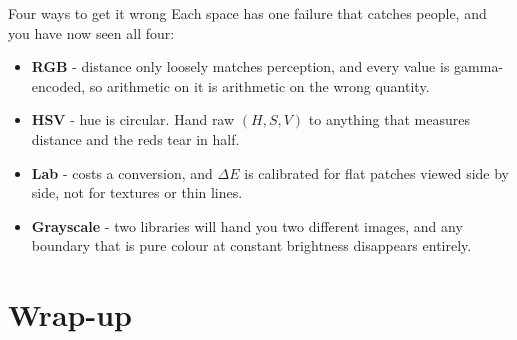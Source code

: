 \documentclass[aspectratio=169]{beamer}
\begin{document}
\begin{frame}{Four ways to get it wrong}
  \small
  Each space has one failure that catches people, and you have now seen all four:
  \vskip 6pt
  \begin{itemize}\small
    \item \textbf{RGB} - distance only loosely matches perception, and every value is
      gamma-encoded, so arithmetic on it is arithmetic on the wrong quantity.
    \item \textbf{HSV} - hue is circular. Hand raw $(H, S, V)$ to anything that measures
      distance and the reds tear in half.
    \item \textbf{Lab} - costs a conversion, and $\Delta E$ is calibrated for flat patches
      viewed side by side, not for textures or thin lines.
    \item \textbf{Grayscale} - two libraries will hand you two different images, and any
      boundary that is pure colour at constant brightness disappears entirely.
  \end{itemize}
  \vskip 6pt
\end{frame}

\section*{Wrap-up}
\end{document}
